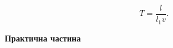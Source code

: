 \documentclass[12pt,a4paper]{article}
\begin{document}
    \begin{equation}
        T = \frac{l}{l_1v}.
        \tag{3.14}
    \end{equation}


    \newpage

    \begin{center}
        \textbf{\large Практична частина}
    \end{center}

\end{document}
